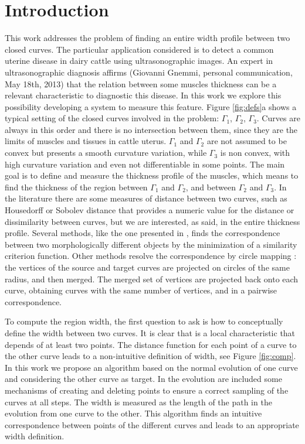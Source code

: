 \documentclass{article}
\begin{document}
\section{Introduction}
\label{sec:intro}
This work addresses the problem of finding an entire width profile between two closed curves. The particular application considered is to detect a common uterine disease in dairy cattle using ultrasonographic images. An expert in ultrasonographic diagnosis affirms (Giovanni Gnemmi, personal communication, May 18th, 2013) that the relation between some muscles thickness can be a relevant characteristic to diagnostic this disease. In this work we explore this possibility developing a system to measure this feature. Figure \ref{fig:defs}a shows a typical setting of the closed curves involved in the problem: $\Gamma_1$, $\Gamma_2$, $\Gamma_3$. Curves are always in this order and there is no intersection between them, since they are the limits of muscles and tissues in cattle uterus. $\Gamma_1$ and $\Gamma_2$ are not assumed to be convex but presents a smooth curvature variation, while $\Gamma_3$ is non convex, with high curvature variation and even not differentiable in some points. The main goal is to define and measure the thickness profile of the muscles, which means to find the thickness of the region between $\Gamma_1$ and $\Gamma_2$, and between $\Gamma_2$ and $\Gamma_3$. In the literature there are some measures of distance between two curves, such as Housedorff \cite{libroMorel} or Sobolev \cite{statistics} distance that provides a numeric value for the distance or dissimilarity between curves, but we are interested, as said, in the entire thickness profile. Several methods, like the one presented in \cite{paperWarping}, finds the correspondence between two morphologically different objects by the minimization of a similarity criterion function. Other methods resolve the correspondence by circle mapping \cite{libro}: the vertices of the source and target curves are projected on circles of the same radius, and then merged. The merged set of vertices are projected back onto each curve, obtaining curves with the same number of vertices, and in a pairwise correspondence.

To compute the region width, the first question to ask is how to conceptually define the width between two curves. It is clear that is a local characteristic that depends of at least two points. The distance function for each point of a curve to the other curve leads to a non-intuitive definition of width, see Figure \ref{fig:comp}. In this work we propose an algorithm based on the normal evolution of one curve and considering the other curve as target. In the evolution are included some mechanisms of creating and deleting points to ensure a correct sampling of the curves at all steps. The width is measured as the length of the path in the evolution from one curve to the other. This algorithm finds an intuitive correspondence between points of the different curves and leads to an appropriate width definition.
\end{document}
